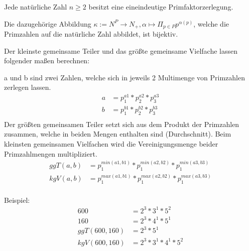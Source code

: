 Jede natürliche Zahl $n \ge 2$ besitzt eine eineindeutige
Primfaktorzerlegung.

Die dazugehörige Abbildung $\kappa:= N^P \rightarrow N_+, \alpha
\mapsto \Pi_{p \in P} p^{\alpha(p)}$, welche die Primzahlen auf die
natürliche Zahl abbildet, ist bijektiv.

Der kleinste gemeinsame Teiler und das größte gemeinsame Vielfache
lassen folgender maßen berechnen:

a und b sind zwei Zahlen, welche sich in jeweils 2 Multimenge von Primzahlen
zerlegen lassen.
\begin{align*}
  a &= p_1^{a1} * p_2^{a2} * p_3^{a3}\\
  b &= p_1^{b1} * p_2^{b2} * p_3^{b3}\\
\end{align*}
Der größten gemeinsamen Teiler setzt sich aus dem Produkt der
Primzahlen zusammen, welche in beiden Mengen enthalten sind
(Durchschnitt). Beim kleinsten gemeinsamen Vielfachen wird die
Vereinigungsmenge beider Primzahlmengen multipliziert.
\begin{align*}
  ggT(a,b) &= p_1^{min(a1,b1)} * p_1^{min(a2,b2)} * p_1^{min(a3,b3)}\\
  kgV(a,b) &= p_1^{max(a1,b1)} * p_1^{max(a2,b2)} * p_1^{max(a3,b3)}\\
\end{align*}

Beispiel:
\begin{align*}
  600 &= 2^3 * 3^1 * 5^2\\
  160 &= 2^3 * 4^1 * 5^1\\
  ggT(600, 160) &= 2^3 * 5^1\\
  kgV(600, 160) &= 2^3 * 3^1 * 4^1 * 5^2\\
\end{align*}

